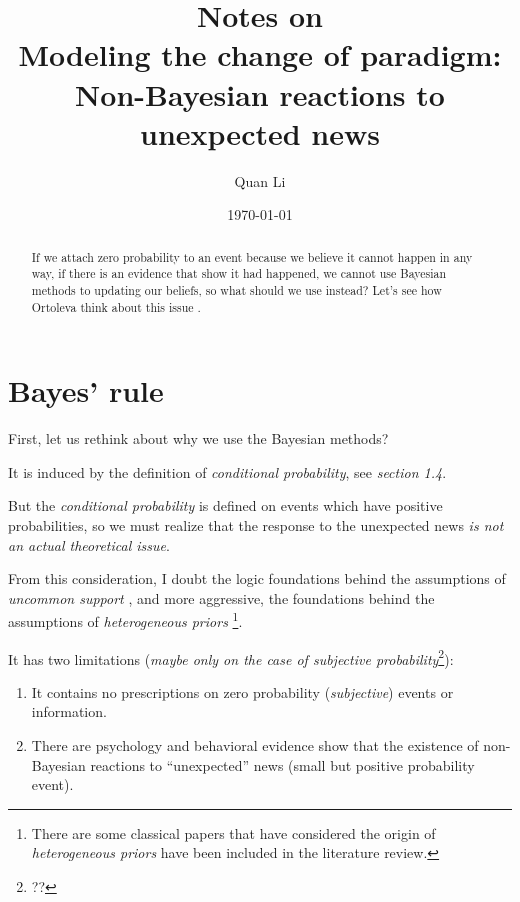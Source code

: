 \documentclass[12pt,letterpaper]{article}
\theoremstyle{definition}   %
\begin{document}
\title{\textbf{Notes on \cite{ortoleva2012modeling}}\\{\small \textbf{Modeling the change of paradigm: Non-Bayesian reactions to unexpected news}}}
\author{Quan Li}
\date{\today}
\maketitle

\begin{abstract}
If we attach zero probability to an event because we believe it cannot happen in any way, if there is an evidence that show it had happened, we cannot use Bayesian methods to updating our beliefs, so what should we use instead? Let's see how Ortoleva think about this issue \citep{ortoleva2012modeling}.
\end{abstract}



\section{Bayes' rule}

First, let us rethink about why we use the Bayesian methods?

It is induced by the definition of \emph{conditional probability}, see \cite{hogg2005introduction} \textit{section 1.4}.

But the \emph{conditional probability} is defined on events which have positive probabilities, so we must realize that the response to the unexpected news \emph{is not an actual theoretical issue}.

From this consideration, I doubt the logic foundations behind the assumptions of \emph{uncommon support} \citep{galperti2015hide}, and more aggressive, the foundations behind the assumptions of \emph{heterogeneous priors} \citep{alonso2016bayesian}\footnote{There are some classical papers that have considered the origin of \emph{heterogeneous priors} have been included in the literature review.}.

It has two limitations (\emph{maybe only on the case of subjective probability}\footnote{??}):

\begin{enumerate}
    \item It contains no prescriptions on zero probability (\emph{subjective}) events or information.
    \item There are psychology and behavioral evidence show that the existence of non-Bayesian reactions to “unexpected” news (small but positive probability event).
\end{enumerate}
\end{document}
